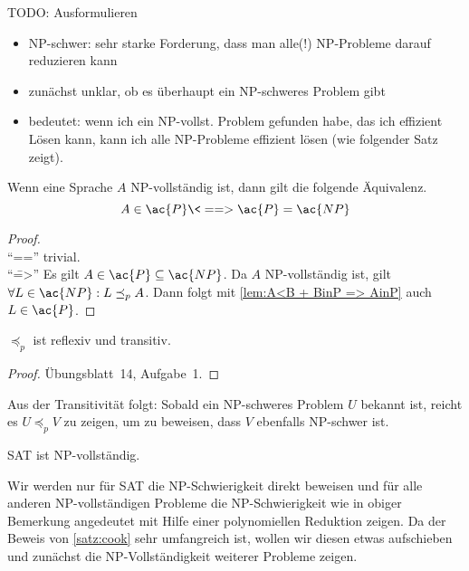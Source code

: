 {\color{red}
TODO: Ausformulieren
\begin{itemize}
 \item \ac{NP}-schwer: sehr starke Forderung, dass man alle(!) \ac{NP}-Probleme darauf reduzieren kann
 \item zunächst unklar, ob es überhaupt ein \ac{NP}-schweres Problem gibt
 \item bedeutet: wenn ich ein \ac{NP}-vollst. Problem gefunden habe, das ich effizient Lösen kann, kann ich alle \ac{NP}-Probleme effizient lösen (wie folgender Satz zeigt).
\end{itemize}
}
\begin{Satz}
	Wenn eine Sprache $A$ \ac{NP}-vollständig ist, dann gilt die folgende Äquivalenz.
	\[ A\in \ac{P} \<==> \ac{P} =\ac{NP} \qedhere \]
\end{Satz}
\begin{proof}\ \\
	"`\<=="' trivial.\\
	"`\==>"' Es gilt $A\in \ac{P} \subseteq \ac{NP}$. Da $A$ \ac{NP}-vollständig ist, gilt $\forall L\in \ac{NP}: L\preceq_p A$. Dann folgt mit \autoref{lem:A<B + BinP => AinP} auch $L\in \ac{P}$.
\end{proof}

\begin{lemma}[name={[$\preceq_p$ ist reflexiv und transitiv]}]
	$\preceq_p$ ist reflexiv und transitiv.
\end{lemma}
\begin{proof}
Übungsblatt~14, Aufgabe~1.
\end{proof}

\begin{Bem}
    Aus der Transitivität folgt:
	Sobald ein \ac{NP}-schweres Problem $U$ bekannt ist, reicht es $U\preceq_p V$ zu zeigen, um zu beweisen, dass $V$ ebenfalls \ac{NP}-schwer ist.
\end{Bem}

\begin{Satz}\label{satz:cook}
	\ac{SAT} ist \ac{NP}-vollständig.
\end{Satz}
Wir werden nur für \ac{SAT} die \ac{NP}-Schwierigkeit direkt beweisen und für alle anderen \ac{NP}-vollständigen Probleme die \ac{NP}-Schwierigkeit wie in obiger Bemerkung angedeutet mit Hilfe einer polynomiellen Reduktion zeigen.
Da der Beweis von \autoref{satz:cook} sehr umfangreich ist, wollen wir diesen etwas aufschieben und zunächst die \ac{NP}-Vollständigkeit weiterer Probleme zeigen.


